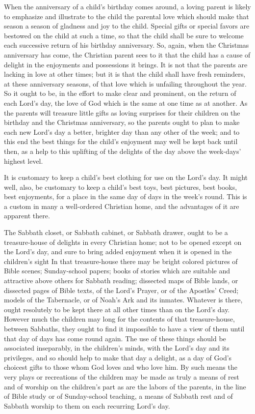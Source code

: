 \documentclass[
]{book}
\begin{document}
When the anniversary of a child's birthday comes around, a loving parent is likely to emphasize and illustrate to the child the parental love which should make that season a season of gladness and joy to the child. Special gifts or special favors are bestowed on the child at such a time, so that the child shall be sure to welcome each successive return of his birthday anniversary. So, again, when the Christmas anniversary has come, the Christian parent sees to it that the child has a cause of delight in the enjoyments and possessions it brings. It is not that the parents are lacking in love at other times; but it is that the child shall have fresh reminders, at these anniversary seasons, of that love which is unfailing throughout the year. So it ought to be, in the effort to make clear and prominent, on the return of each Lord's day, the love of God which is the same at one time as at another. As the parents will treasure little gifts as loving surprises for their children on the birthday and the Christmas anniversary, so the parents ought to plan to make each new Lord's day a better, brighter day than any other of the week; and to this end the best things for the child's enjoyment may well be kept back until then, as a help to this uplifting of the delights of the day above the week-days' highest level.

It is customary to keep a child's best clothing for use on the Lord's day. It might well, also, be customary to keep a child's best toys, best pictures, best books, best enjoyments, for a place in the same day of days in the week's round. This is a custom in many a well-ordered Christian home, and the advantages of it are apparent there.

The Sabbath closet, or Sabbath cabinet, or Sabbath drawer, ought to be a treasure-house of delights in every Christian home; not to be opened except on the Lord's day, and sure to bring added enjoyment when it is opened in the children's sight In that treasure-house there may be bright colored pictures of Bible scenes; Sunday-school papers; books of stories which are suitable and attractive above others for Sabbath reading; dissected maps of Bible lands, or dissected pages of Bible texts, of the Lord's Prayer, or of the Apostles' Creed; models of the Tabernacle, or of Noah's Ark and its inmates. Whatever is there, ought resolutely to be kept there at all other times than on the Lord's day. However much the children may long for the contents of that treasure-house, between Sabbaths, they ought to find it impossible to have a view of them until that day of days has come round again. The use of these things should be associated inseparably, in the children's minds, with the Lord's day and its privileges, and so should help to make that day a delight, as a day of God's choicest gifts to those whom God loves and who love him. By such means the very plays or recreations of the children may be made as truly a means of rest and of worship on the children's part as are the labors of the parents, in the line of Bible study or of Sunday-school teaching, a means of Sabbath rest and of Sabbath worship to them on each recurring Lord's day.
\end{document}
